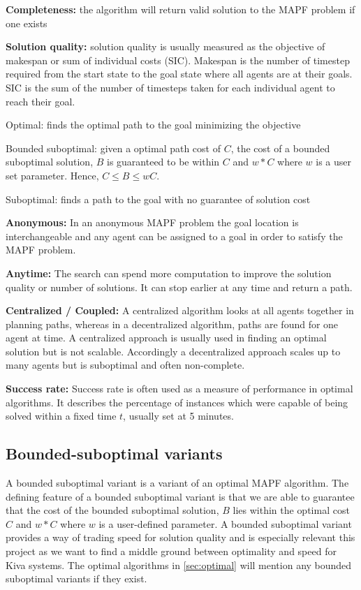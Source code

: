 \documentclass[a4paper,11pt]{article}
\begin{document}
\noindent \textbf{Completeness:} the algorithm will return valid solution to the MAPF problem if one exists

\noindent \textbf{Solution quality:} solution quality is usually measured as the objective of makespan or sum of individual costs (SIC). Makespan is the number of timestep required from the start state to the goal state where all agents are at their goals. SIC is the sum of the number of timesteps taken for each individual agent to reach their goal.
\begin{compactitem}
	\item Optimal: finds the optimal path to the goal minimizing the objective
	\item Bounded suboptimal: given a optimal path cost of $C$, the cost of a bounded suboptimal solution, $B$ is guaranteed to be within $C$ and $w*C$ where $w$ is a user set parameter. Hence, $C \le B \le wC$.
	\item Suboptimal: finds a path to the goal with no guarantee of solution cost
\end{compactitem}

\noindent \textbf{Anonymous:} In an anonymous MAPF problem the goal location is interchangeable and any agent can be assigned to a goal in order to satisfy the MAPF problem.

\noindent \textbf{Anytime:} The search can spend more computation to improve the solution quality or number of solutions. It can stop earlier at any time and return a path.

\noindent \textbf{Centralized / Coupled:} A centralized algorithm looks at all agents together in planning paths, whereas in a decentralized algorithm, paths are found for one agent at time. A centralized approach is usually used in finding an optimal solution but is not scalable. Accordingly a decentralized approach scales up to many agents but is suboptimal and often non-complete.

\noindent \textbf{Success rate:} Success rate is often used as a measure of performance in optimal algorithms. It describes the percentage of instances which were capable of being solved within a fixed time $t$, usually set at 5 minutes.

\subsection{Bounded-suboptimal variants} 
A bounded suboptimal variant is a variant of an optimal MAPF algorithm. The defining feature of a bounded suboptimal variant is that we are able to guarantee that the cost of the bounded suboptimal solution, $B$ lies within the optimal cost $C$ and $w*C$ where $w$ is a user-defined parameter. A bounded suboptimal variant provides a way of trading speed for solution quality and is especially relevant this project as we want to find a middle ground between optimality and speed for Kiva systems. The optimal algorithms in \ref{sec:optimal} will mention any bounded suboptimal variants if they exist.
\end{document}
